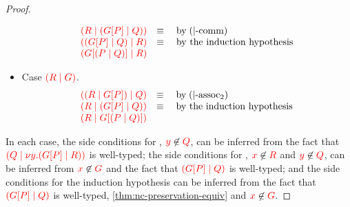 \begin{proof}
\begin{itemize}
\[\begin{array}{ll}
        \textcolor{red}{(R \mid ({G}[{P}] \mid Q))} & \equiv \quad \text{by} \; (|\text{-comm}) \\
        \textcolor{red}{(({G}[{P}] \mid Q) \mid R)} & \equiv \quad \text{by the induction hypothesis} \\
        \textcolor{red}{({G}[{(P \mid Q)}] \mid R)} &
      \end{array}
    \]
  \item
    Case $\textcolor{red}{(R \mid G)}$.
    \[\!
      \begin{array}{ll}
        \textcolor{red}{((R \mid {G}[{P}]) \mid Q)} & \equiv \quad \text{by} \; (|\text{-assoc}_2) \\
        \textcolor{red}{(R \mid ({G}[{P}] \mid Q))} & \equiv \quad \text{by the induction hypothesis} \\
        \textcolor{red}{(R \mid {G}[{(P \mid Q)}])} &
      \end{array}
    \]
  \end{itemize}
  In each case, the side conditions for , $\textcolor{red}{y}\not\in\textcolor{red}{Q}$,
  can be inferred from the fact that
  $\textcolor{red}{(Q \mid \nu y.({G}[{P}] \mid R))}$ is well-typed; the side
  conditions for , $\textcolor{red}{x}\not\in\textcolor{red}{R}$ and $\textcolor{red}{y}\not\in\textcolor{red}{Q}$, can
  be inferred from $\textcolor{red}{x}\not\in\textcolor{red}{G}$ and the fact that
  $\textcolor{red}{({G}[{P}] \mid Q)}$ is well-typed; and the side conditions for
  the induction hypothesis can be inferred from the fact that
  $\textcolor{red}{({G}[{P}] \mid Q)}$ is well-typed,
  \cref{thm:nc-preservation-equiv} and $\textcolor{red}{x}\not\in\textcolor{red}{G}$. 
\end{proof}
